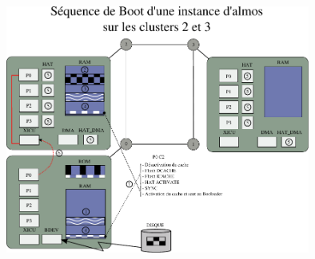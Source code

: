 \documentclass[12pt,francais]{beamer}
\begin{document}
\normalsize
\begin{frame}
        \includegraphics[width=10cm]{boot_23_simple.pdf}
\end{frame}
\end{document}
